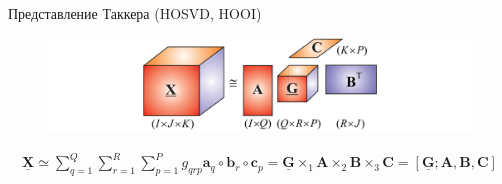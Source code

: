 \documentclass{beamer}
\begin{document}
\begin{frame}{Представление Таккера (HOSVD, HOOI)}

    \begin{figure}
        \centering
        \includegraphics[width = \textwidth]{images/TensorTKD.png}
    \end{figure}

    \begin{align*}  
        \mathbf{\underline{X}} \simeq \sum_{q=1}^{Q} \sum_{r=1}^{R} \sum_{p=1}^{P} g_{qrp} \mathbf{a}_q \circ \mathbf{b}_r \circ \mathbf{c}_p = \mathbf{\underline{G}} \times_1 \mathbf{A} \times_2 \mathbf{B} \times_3 \mathbf{C} = \left[    \mathbf{\underline{G}}; \mathbf{A}, \mathbf{B}, \mathbf{C} \right]
    \end{align*}

\end{frame}

\end{document}
